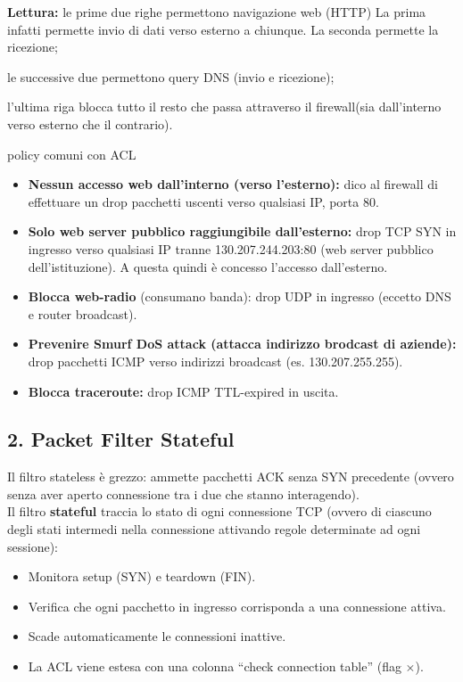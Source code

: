 \documentclass[a4paper,12pt]{report}
\begin{document}
\vspace{0.3em}
\textbf{Lettura:} le prime due righe permettono navigazione web (HTTP) La prima infatti permette invio di dati verso esterno a chiunque. 
La seconda permette la ricezione; 

le successive due permettono query DNS (invio e ricezione);

l'ultima riga blocca tutto il resto che passa attraverso il firewall(sia dall'interno verso esterno che il contrario).

\begin{esempiobox}{policy comuni con ACL}
\begin{itemize}[noitemsep]
  \item \textbf{Nessun accesso web dall'interno (verso l'esterno):}
        dico al firewall  di effettuare un drop pacchetti uscenti verso qualsiasi IP, porta 80.
  \item \textbf{Solo web server pubblico raggiungibile dall'esterno:}
        drop TCP SYN in ingresso verso qualsiasi IP tranne 130.207.244.203:80 (web server pubblico dell'istituzione). A questa quindi è concesso l'accesso dall'esterno.
  \item \textbf{Blocca web-radio} (consumano banda):
        drop UDP in ingresso (eccetto DNS e router broadcast).
  \item \textbf{Prevenire Smurf DoS attack (attacca indirizzo brodcast di aziende):}
        drop pacchetti ICMP verso indirizzi broadcast (es. 130.207.255.255).
  \item \textbf{Blocca traceroute:}
        drop ICMP TTL-expired in uscita.
\end{itemize}
\end{esempiobox}

\subsection{2. Packet Filter Stateful}

Il filtro stateless \`e grezzo: ammette pacchetti ACK senza SYN precedente (ovvero senza aver aperto connessione tra i due che stanno interagendo).\\
Il filtro \textbf{stateful} traccia lo stato di ogni connessione TCP (ovvero di ciascuno degli stati intermedi nella connessione attivando regole determinate ad ogni sessione):
\begin{itemize}[noitemsep]
  \item Monitora setup (SYN) e teardown (FIN).
  \item Verifica che ogni pacchetto in ingresso corrisponda a una connessione attiva.
  \item Scade automaticamente le connessioni inattive.
  \item La ACL viene estesa con una colonna ``check connection table'' (flag $\times$).
\end{itemize}
\end{document}
